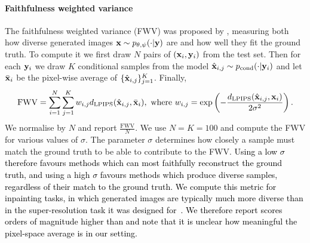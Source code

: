 \paragraph{Faithfulness weighted variance}
The faithfulness weighted variance (FWV) was proposed by
\citet{li2020multimodal}, measuring both how diverse generated images
${\mathbf{x}}\sim p_{\theta,\psi}(\cdot|{\mathbf{y}})$ are and how well they fit the ground truth.
To compute it we first draw $N$ pairs of $({\mathbf{x}}_i, {\mathbf{y}}_i)$ from the test
set. Then for each ${\mathbf{y}}_i$ we draw $K$ conditional samples from the model
$\hat{{\mathbf{x}}}_{i,j} \sim p_{\text{cond}}(\cdot | {\mathbf{y}}_i)$ and let $\bar{{\mathbf{x}}}_i$ be the
pixel-wise average of $\{\hat{{\mathbf{x}}}_{i,j}\}_{j=1}^K$. Finally,
\begin{equation}
  \text{FWV} = \sum_{i=1}^N \sum_{j=1}^K w_{i,j} d_{\text{LPIPS}}(\hat{{\mathbf{x}}}_{i,j}, \bar{{\mathbf{x}}}_i),
  \text{ where }
  w_{i,j} = \exp \left(- \frac{d_{\text{LPIPS}}(\hat{{\mathbf{x}}}_{i,j}, {\mathbf{x}}_i)}{2\sigma^2} \right).
\end{equation}
We normalise by $N$ and report $\frac{\text{FWV}}{N}$. We use $N = K = 100$ and
compute the FWV for various values of $\sigma$. The parameter $\sigma$
determines how closely a sample must match the ground truth to be able to
contribute to the FWV. \textcolor{black}{Using a low $\sigma$ therefore favours
  methods which can most faithfully reconstruct the ground truth, and using a
  high $\sigma$ favours methods which produce diverse samples, regardless of
  their match to the ground truth. We compute this metric for inpainting tasks,
  in which generated images are typically much more diverse than in the
  super-resolution task it was designed for~\citep{li2020multimodal}. We
  therefore report scores orders of magnitude higher than
  \citet{li2020multimodal} and note that it is unclear how meaningful the
  pixel-space average is in our setting. }


